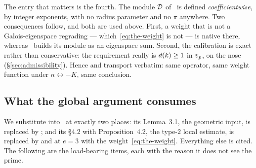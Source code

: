 The entry that matters is the fourth. The module $\mathcal{D}$ of~\cite[\S4.2]{kramermiller2020abelian} is defined \emph{coefficientwise}, by
integer exponents, with no radius parameter and no $\pi$ anywhere. Two
consequences follow, and both are used above. First, a weight that is not a
Galois-eigenspace regrading --- which~\eqref{eq:the-weight} is not --- is
native there, whereas~\cite[Definition 6.3]{kramermillerupton2021newton} builds its
module as an eigenspace sum. Second, the calibration is exact rather than
conservative: the requirement really is $d(k) \ge 1$ in $v_p$, on the
nose (\S\ref{sec:admissibility}). Hence  and
 transport verbatim: same operator, same weight function
under $n \leftrightarrow -K$, same conclusion.

\subsection{What the global argument consumes}
\label{sec:consumption}

We substitute into~\cite{kramermiller2020abelian} at exactly two places:
its Lemma~3.1, the geometric input, is replaced by ; and its
\S4.2 with Proposition~4.2, the type-$2$ local estimate, is replaced by
 and  at $e =
3$ with the weight~\eqref{eq:the-weight}. Everything else is cited. The
following are the load-bearing items, each with the reason it does not see
the prime.

